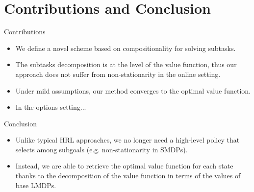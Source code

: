 \documentclass{beamer}
\theoremstyle{mystyle}
\begin{document}
\section{Contributions and Conclusion}
\begin{frame}{Contributions}
\begin{itemize}
    \item We define a novel scheme based on compositionality for solving subtasks. 
    \item The subtasks decomposition is at the level of the value function, thus our approach does not suffer from non-stationarity in the online setting. 
    \item Under mild assumptions, our method converges to the optimal value function.
    \item {\color{myred} In the options setting...}

\end{itemize}

\end{frame}

\begin{frame}{Conclusion}

    \begin{itemize}
        \item Unlike typical HRL approaches, we no longer need a high-level policy that selects among subgoals (e.g. non-stationarity in SMDPs). 
        \item Instead, we are able to retrieve the optimal value function for each state thanks to the decomposition of the value function in terms of the values of base LMDPs.
    \end{itemize}

\end{frame}


\begin{frame}[allowframebreaks]{}
    
    
\end{frame}
\end{document}
